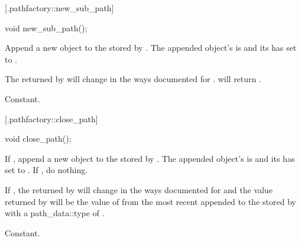  [\iotwod.pathfactory::new_sub_path] {}

%
%
\begin{itemdecl}
void new_sub_path();
\end{itemdecl}
\begin{itemdescr}
	\pnum
	\effects
	Append a new  object to the  stored by 
	. The appended object's  is 
	 and its  has 
	 set to .
	
	\pnum
	\postconditions
	The  returned by  will change 
	in the ways documented for .
	 will return .
	
	\pnum
	\complexity
	Constant.
\end{itemdescr}

 [\iotwod.pathfactory::close_path] {}

%
%
\begin{itemdecl}
void close_path();
\end{itemdecl}
\begin{itemdescr}
	\pnum
	\effects
	If , append a new  
	object to the  stored by . The appended 
	object's  is  and 
	its  has  set to 
	. If , do nothing.
	
	\pnum
	\postconditions
	If , the  
	returned by  will change in the ways documented for 
	 and the value returned by 
	 will be the value of 
	 from the most recent  
	appended to the  stored by  with a 
	{path_data::type} of .
	
	\pnum
	\complexity
	Constant.
\end{itemdescr}

